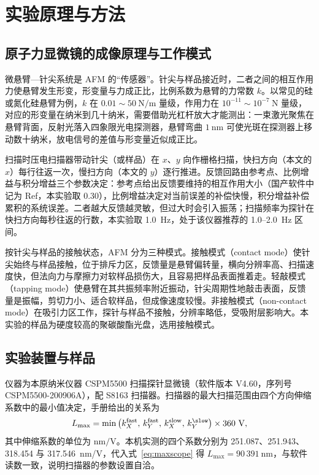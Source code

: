 \documentclass[12pt,a4paper,fontset=windows]{ctexart}
\begin{document}
\section{实验原理与方法}

\subsection{原子力显微镜的成像原理与工作模式}

微悬臂—针尖系统是 AFM 的“传感器”。针尖与样品接近时，二者之间的相互作用力使悬臂发生形变，形变量与力成正比，比例系数为悬臂的力常数 $k$。以常见的硅或氮化硅悬臂为例，$k$ 在 $0.01\sim 50~\mathrm{N/m}$ 量级，作用力在 $10^{-11}\sim10^{-7}~\mathrm{N}$ 量级，对应的形变量在纳米到几十纳米，需要借助光杠杆放大才能测出：一束激光聚焦在悬臂背面，反射光落入四象限光电探测器，悬臂弯曲 $1~\mathrm{nm}$ 可使光斑在探测器上移动数十纳米，放电信号的差值与形变量近似成正比。

扫描时压电扫描器带动针尖（或样品）在 $x$、$y$ 向作栅格扫描，快扫方向（本文的 $x$）每行往返一次，慢扫方向（本文的 $y$）逐行推进。反馈回路由参考点、比例增益与积分增益三个参数决定：参考点给出反馈要维持的相互作用大小（国产软件中记为 Ref，本实验取 0.30），比例增益决定对当前误差的补偿快慢，积分增益补偿累积的系统误差\cite{manual_cspm}。二者越大反馈越灵敏，但过大时会引入振荡；扫描频率为探针在快扫方向每秒往返的行数，本实验取 1.0~Hz，处于该仪器推荐的 1.0--2.0~Hz 区间。

按针尖与样品的接触状态，AFM 分为三种模式。接触模式（contact mode）使针尖始终与样品接触，位于排斥力区，反馈量是悬臂偏转量，横向分辨率高、扫描速度快，但法向力与摩擦力对软样品损伤大，且容易把样品表面推着走。轻敲模式（tapping mode）使悬臂在其共振频率附近振动，针尖周期性地敲击表面，反馈量是振幅，剪切力小、适合软样品，但成像速度较慢。非接触模式（non-contact mode）在吸引力区工作，探针与样品不接触，分辨率略低，受吸附层影响大。本实验的样品为硬度较高的聚碳酸酯光盘，选用接触模式。

\subsection{实验装置与样品}

仪器为本原纳米仪器 CSPM5500 扫描探针显微镜（软件版本 V4.60，序列号 CSPM5500-200906A），配 S8163 扫描器。扫描器的最大扫描范围由四个方向伸缩系数中的最小值决定，手册给出的关系为
\begin{equation}
L_{\max} = \min\left(k_{X}^{\text{fast}},\,k_{Y}^{\text{fast}},\,k_{X}^{\text{slow}},\,k_{Y}^{\slow}\right)\times 360~\mathrm{V},
\label{eq:maxscope}
\end{equation}
其中伸缩系数的单位为 $\mathrm{nm/V}$。本机实测的四个系数分别为 251.087、251.943、318.454 与 317.546~nm/V，代入式~\eqref{eq:maxscope} 得 $L_{\max}=90\,391~\mathrm{nm}$，与软件读数一致，说明扫描器的参数设置自洽。
\end{document}
